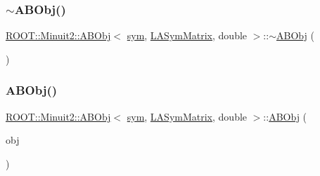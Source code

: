 \mbox{\label{classROOT_1_1Minuit2_1_1ABObj_3_01sym_00_01LASymMatrix_00_01double_01_4_a42b0b36ac55162609ddc385b3631cb6b}} 
\subsubsection{\texorpdfstring{$\sim$ABObj()}{~ABObj()}\hspace{0.1cm}{\footnotesize\ttfamily [2/2]}}
{\footnotesize\ttfamily \mbox{\hyperlink{classROOT_1_1Minuit2_1_1ABObj}{R\+O\+O\+T\+::\+Minuit2\+::\+A\+B\+Obj}}$<$ \mbox{\hyperlink{classROOT_1_1Minuit2_1_1sym}{sym}}, \mbox{\hyperlink{classROOT_1_1Minuit2_1_1LASymMatrix}{L\+A\+Sym\+Matrix}}, double $>$\+::$\sim$\mbox{\hyperlink{classROOT_1_1Minuit2_1_1ABObj}{A\+B\+Obj}} (\begin{DoxyParamCaption}{ }\end{DoxyParamCaption})\hspace{0.3cm}{\ttfamily [inline]}}

\mbox{\label{classROOT_1_1Minuit2_1_1ABObj_3_01sym_00_01LASymMatrix_00_01double_01_4_ad172181f07e897f45d1fe0d7954bb03b}} 
\subsubsection{\texorpdfstring{ABObj()}{ABObj()}\hspace{0.1cm}{\footnotesize\ttfamily [7/8]}}
{\footnotesize\ttfamily \mbox{\hyperlink{classROOT_1_1Minuit2_1_1ABObj}{R\+O\+O\+T\+::\+Minuit2\+::\+A\+B\+Obj}}$<$ \mbox{\hyperlink{classROOT_1_1Minuit2_1_1sym}{sym}}, \mbox{\hyperlink{classROOT_1_1Minuit2_1_1LASymMatrix}{L\+A\+Sym\+Matrix}}, double $>$\+::\mbox{\hyperlink{classROOT_1_1Minuit2_1_1ABObj}{A\+B\+Obj}} (\begin{DoxyParamCaption}\item[{const \mbox{\hyperlink{classROOT_1_1Minuit2_1_1ABObj}{A\+B\+Obj}}$<$ \mbox{\hyperlink{classROOT_1_1Minuit2_1_1sym}{sym}}, \mbox{\hyperlink{classROOT_1_1Minuit2_1_1LASymMatrix}{L\+A\+Sym\+Matrix}}, double $>$ \&}]{obj }\end{DoxyParamCaption})\hspace{0.3cm}{\ttfamily [inline]}}


